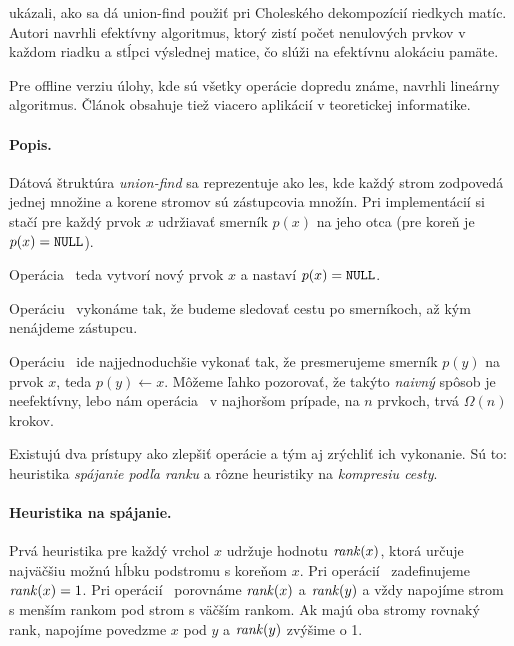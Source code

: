 \citet{cholesky} ukázali, ako sa dá union-find použiť pri Choleského dekompozícií
riedkych matíc. Autori navrhli efektívny algoritmus, ktorý zistí počet nenulových
prvkov v každom riadku a stĺpci výslednej matice, čo slúži na efektívnu alokáciu
pamäte.

Pre offline verziu úlohy, kde sú všetky operácie dopredu známe, \citep{offline-uf}
navrhli lineárny algoritmus. Článok obsahuje tiež viacero aplikácií v teoretickej
informatike.


\paragraph{Popis.}
Dátová štruktúra \emph{union-find} sa reprezentuje ako les, kde každý strom zodpovedá
jednej množine a korene stromov sú zástupcovia množín. Pri implementácií si
stačí pre každý prvok $x$ udržiavať smerník $p(x)$ na jeho otca
(pre koreň je $p(x)=\texttt{NULL}$).

Operácia \makeset\ teda vytvorí nový prvok $x$ a nastaví $p(x) = \texttt{NULL}$. 

Operáciu \find\ vykonáme tak, že budeme sledovať cestu po smerníkoch, až 
kým nenájdeme zástupcu. 

Operáciu \union\ ide najjednoduchšie vykonať tak, že presmerujeme smerník 
$p(y)$ na prvok $x$, teda $p(y) \gets x$. 
Môžeme ľahko pozorovať, že takýto \emph{naivný} spôsob je neefektívny, 
lebo nám operácia \find\ v najhoršom prípade, na $n$ prvkoch, trvá $\Omega(n)$ 
krokov. 

\smallskip
Existujú dva prístupy ako zlepšiť operácie a tým aj zrýchliť ich vykonanie. 
Sú to: heuristika \emph{spájanie podľa ranku} a rôzne heuristiky na 
\emph{kompresiu cesty}. 

\paragraph{Heuristika na spájanie.}

Prvá heuristika pre každý vrchol $x$ udržuje hodnotu $\mathop{\mathit{rank}}(x)$,
ktorá určuje najväčšiu možnú hĺbku podstromu s koreňom $x$.
Pri o\-pe\-rá\-cií \makeset\ zadefinujeme $\mathop{\mathit{rank}}(x) = 1$. 
Pri o\-pe\-rá\-cií \union\ porovnáme $\mathop{\mathit{rank}}(x)$ a $\mathop{\mathit{rank}}(y)$
a vždy napojíme strom s menším rankom pod strom s väčším rankom.
Ak majú oba stromy rovnaký rank, napojíme povedzme $x$ pod $y$
a $\mathop{\mathit{rank}}(y)$ zvýšime o 1.

